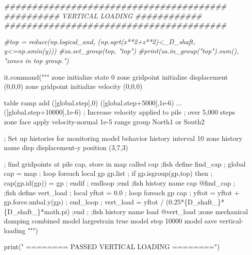 \documentclass[a4paper, nobind]{templates/ociamthesis}
\newenvironment{Shaded}{\begin{snugshade}}{\end{snugshade}}
\newcommand{\BuiltInTok}[1]{#1}
\newcommand{\CommentTok}[1]{\textcolor[rgb]{0.56,0.35,0.01}{\textit{#1}}}
\newcommand{\NormalTok}[1]{#1}
\newcommand{\SpecialCharTok}[1]{\textcolor[rgb]{0.00,0.00,0.00}{#1}}
\newcommand{\StringTok}[1]{\textcolor[rgb]{0.31,0.60,0.02}{#1}}
\renewenvironment{Shaded}
{
  \vspace{10pt}%
  \begin{snugshade}%
}{%
  \end{snugshade}%
  \vspace{8pt}%
}
\begin{document}
\begin{Shaded}
\begin{Highlighting}[]
\CommentTok{\#\#\#\#\#\#\#\#\#\#\#\#\#\#\#\#\#\#\#\#\#\#\#\#\#\#\#\#\#\#\#\#\#\#\#\#\#\#\#\#}
\CommentTok{\#\#\#\#\#\#\#\#\#\# VERTICAL LOADING \#\#\#\#\#\#\#\#\#\#\#\#}
\CommentTok{\#\#\#\#\#\#\#\#\#\#\#\#\#\#\#\#\#\#\#\#\#\#\#\#\#\#\#\#\#\#\#\#\#\#\#\#\#\#\#\#}

\CommentTok{\#top = reduce(np.logical\_and, (np.sqrt(x**2+z**2)\textless{}\_D\_shaft, y\textless{}=np.amin(y)))}
\CommentTok{\#za.set\_group(top, "top")}
\CommentTok{\#print(za.in\_group("top").sum(), "zones in top group.")}

\NormalTok{it.command(}\StringTok{"""}
\StringTok{zone initialize state 0}
\StringTok{zone gridpoint initialize displacement (0,0,0)}
\StringTok{zone gridpoint initialize velocity     (0,0,0) }

\StringTok{table \textquotesingle{}ramp\textquotesingle{} add ([global.step],0) ([global.step+5000],1e{-}6) ...}
\StringTok{      ([global.step+10000],1e{-}6) ; Increase velocity applied to pile}
\StringTok{                                  ; over 5,000 steps}
\StringTok{                                  }
\StringTok{zone face apply velocity{-}normal 1e{-}5 range group \textquotesingle{}North1\textquotesingle{} or \textquotesingle{}South2\textquotesingle{}}

\StringTok{; Set up histories for monitoring model behavior}
\StringTok{history interval 10}
\StringTok{zone history name \textquotesingle{}disp\textquotesingle{} displacement{-}y position (3,7,3)}

\StringTok{; find gridpoints at pile cap, store in map called cap}
\StringTok{;fish define find\_cap}
\StringTok{;    global cap = map}
\StringTok{;    loop foreach local gp gp.list}
\StringTok{;        if gp.isgroup(gp,\textquotesingle{}top\textquotesingle{}) then}
\StringTok{;            cap(gp.id(gp)) = gp}
\StringTok{;        endif}
\StringTok{;    endloop}
\StringTok{;end}
\StringTok{;fish history name \textquotesingle{}cap\textquotesingle{} @find\_cap}
\StringTok{;}
\StringTok{;fish define vert\_load}
\StringTok{;    local yftot = 0.0}
\StringTok{;    loop foreach gp cap}
\StringTok{;        yftot = yftot + gp.force.unbal.y(gp)}
\StringTok{;    end\_loop}
\StringTok{;    vert\_load = yftot / (0.25*}\SpecialCharTok{\{D\_shaft\_\}}\StringTok{*}\SpecialCharTok{\{D\_shaft\_\}}\StringTok{*math.pi)}
\StringTok{;end}
\StringTok{;}
\StringTok{;fish history name \textquotesingle{}load\textquotesingle{} @vert\_load}
\StringTok{;zone mechanical damping combined}
\StringTok{model largestrain true}
\StringTok{model step 10000}
\StringTok{model save \textquotesingle{}vertical{-}loading\textquotesingle{}}
\StringTok{"""}\NormalTok{)}

\BuiltInTok{print}\NormalTok{(}\StringTok{"               ======== PASSED VERTICAL LOADING ========"}\NormalTok{)}
\end{Highlighting}
\end{Shaded}
\end{document}
